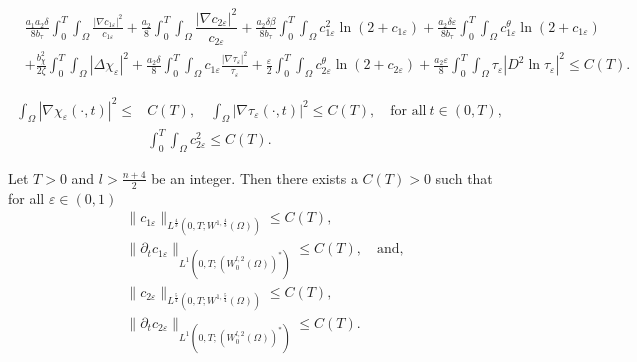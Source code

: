 \documentclass[10pt,a4paper]{amsart}
\begin{document}
    \begin{align}
    \label{entropy_main2}
    \nonumber & \frac{a_1 a_2 \delta}{8 b_\tau} \int_0^T \int_\Omega \frac{|\nabla c_{1\varepsilon}|^2}{c_{1\varepsilon}} + \frac{a_2}{8}  \int_0^T \int_\Omega \dfrac{|\nabla c_{2 \varepsilon}|^2}{c_{2\varepsilon}}+ \frac{a_2 \delta \beta}{8 b_\tau} \int_0^T \int_\Omega c_{1\varepsilon}^2 \ln(2 + c_{1\varepsilon}) + \frac{a_2 \delta \varepsilon}{8 b_\tau} \int_0^T \int_\Omega c_{1\varepsilon}^\theta \ln(2 + c_{1\varepsilon}) \\[5pt]
    &  + \frac{b_\chi^2}{2 \zeta} \int_0^T \int_\Omega |\Delta \chi_\varepsilon|^2  + \frac{a_2 \delta}{8} \int_0^T \int_\Omega c_{1\varepsilon} \frac{|\nabla \tau_\varepsilon|^2}{\tau_\varepsilon}   + \frac{\varepsilon}{2} \int_0^T \int_\Omega c_{2\varepsilon}^\theta \ln(2 + c_{2\varepsilon})  +\frac{a_2 \varepsilon}{8} \int_0^T \int_\Omega \tau_\varepsilon |D^2 \ln \tau_\varepsilon|^2 \leq C(T).
  \end{align}

   \begin{align}
     \label{chi_tau_nab}  \int_\Omega |\nabla \chi_\varepsilon(\cdot, t)|^2 \leq & C(T),  \quad  \int_\Omega |\nabla \tau_\varepsilon(\cdot, t)|^2 \leq C(T),  \quad \text{for all} ~ t \in (0, T), \\[5pt]
     \label{c2_sq} & \int_0^T \int_\Omega c_{2\varepsilon}^2 \leq C(T).
   \end{align}

\begin{Lemma}
  \label{c1_tim_der}
  Let $T > 0$ and $l > \frac{n + 4}{2}$ be an integer. Then there exists a $C(T) > 0$ such that for all $\varepsilon \in (0, 1)$
  \begin{align}
    \label{c1_tim1} & \|c_{1\varepsilon}\|_{L^{\frac{4}{3}}(0, T; W^{1, \frac{4}{3}}(\Omega))} \leq C(T),   \\[5pt]
    \label{c1_tim2} & \|\partial_t c_{1\varepsilon}\|_{L^{1}(0, T; (W^{l, 2}_0(\Omega))^\ast)} \leq C(T), \quad \text{and}, \\[5pt]
    \label{c2_tim1} & \|c_{2\varepsilon}\|_{L^{\frac{5}{4}}(0, T; W^{1, \frac{5}{4}}(\Omega))} \leq C(T),   \\[5pt]
    \label{c2_tim2} & \|\partial_t c_{2\varepsilon}\|_{L^{1}(0, T; (W^{l, 2}_0(\Omega))^\ast)} \leq C(T).
  \end{align}
\end{Lemma}
\end{document}
